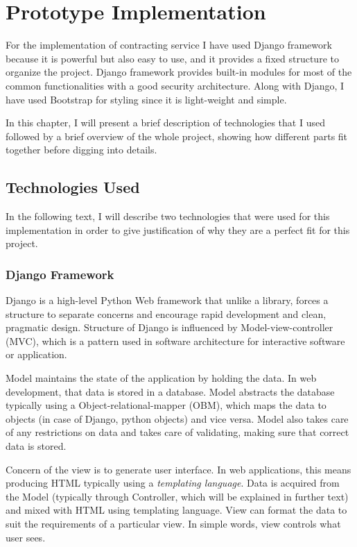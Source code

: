 \chapter{Prototype Implementation}
\label{chapter:implementation}

For the implementation of contracting service I have used Django framework because it is powerful but also easy to use, and it provides a fixed structure to organize the project. Django framework provides built-in modules for most of the common functionalities with a good security architecture. Along with Django, I have used Bootstrap for styling since it is light-weight and simple.

In this chapter, I will present a brief description of technologies that I used followed by a brief overview of the whole project, showing how different parts fit together before digging into details.

\section{Technologies Used}

In the following text, I will describe two technologies that were used for this implementation in order to give justification of why they are a perfect fit for this project.

\subsection{Django Framework}

Django is a high-level Python Web framework that unlike a library, forces a structure to separate concerns and encourage rapid development and clean, pragmatic design. Structure of Django is influenced by Model-view-controller (MVC), which is a pattern used in software architecture for interactive software or application. 

Model maintains the state of the application by holding the data. In web development, that data is stored in a database. Model abstracts the database typically using a Object-relational-mapper (OBM),	 which maps the data to objects (in case of Django, python objects) and vice versa. Model also takes care of any restrictions on data and takes care of validating, making sure that correct data is stored.

Concern of the view is to generate user interface. In web applications, this means producing HTML typically using a \emph{templating language}. Data is acquired from the Model (typically through Controller, which will be explained in further text) and mixed with HTML using templating language. View can format the data to suit the requirements of a particular view. In simple words, view controls what user sees.

